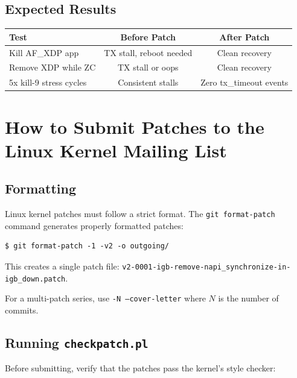 \documentclass[11pt,a4paper,openany]{book}
\begin{document}
\section{Expected Results}

\begin{table}[H]
\centering
\begin{tabular}{lcc}
\toprule
\textbf{Test} & \textbf{Before Patch} & \textbf{After Patch} \\
\midrule
Kill AF\_XDP app          & TX stall, reboot needed & Clean recovery \\
Remove XDP while ZC       & TX stall or oops        & Clean recovery \\
5x kill-9 stress cycles   & Consistent stalls       & Zero tx\_timeout events \\
\bottomrule
\end{tabular}
\end{table}


\chapter{How to Submit Patches to the Linux Kernel Mailing List}
\label{app:submit}

\section{Formatting}

Linux kernel patches must follow a strict format.  The
\texttt{git format-patch} command generates properly formatted patches:

\begin{lstlisting}[style=shellstyle]
$ git format-patch -1 -v2 -o outgoing/
\end{lstlisting}

This creates a single patch file:
\texttt{v2-0001-igb-remove-napi\_synchronize-in-igb\_down.patch}.

For a multi-patch series, use \texttt{-N --cover-letter} where $N$ is
the number of commits.

\section{Running \texttt{checkpatch.pl}}

Before submitting, verify that the patches pass the kernel's style
checker:
\end{document}

